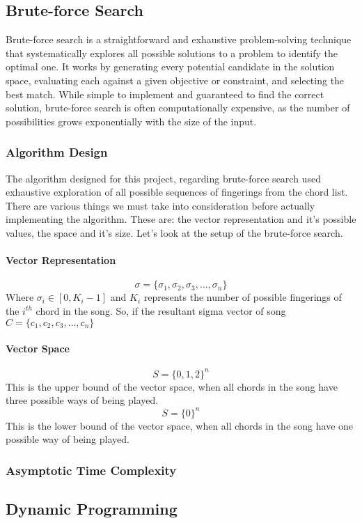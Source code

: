 \documentclass[conference]{IEEEtran}
\begin{document}
\subsection{Brute-force Search}
Brute-force search is a straightforward and exhaustive problem-solving technique that systematically explores all possible solutions to a problem to identify the optimal one. It works by generating every potential candidate in the solution space, evaluating each against a given objective or constraint, and selecting the best match. While simple to implement and guaranteed to find the correct solution, brute-force search is often computationally expensive, as the number of possibilities grows exponentially with the size of the input. 
\subsubsection{Algorithm Design}
The algorithm designed for this project, regarding brute-force search used exhaustive exploration of all possible sequences of fingerings from the chord list. There are various things we must take into consideration before actually implementing the algorithm. These are: the vector representation and it's possible values, the space and it's size. Let's look at the setup of the brute-force search.
\paragraph{Vector Representation}
\[
    \sigma = \{\sigma_1, \sigma_2, \sigma_3, \ldots, \sigma_n\}
\]
\indent Where \(\sigma_i \in [0, K_i - 1]\) and \( K_i \) represents the number of possible fingerings of the $i^{th}$ chord in the song. So, if the resultant sigma vector of song \(C=\{c_1, c_2, c_3, \dots, c_n\}\)

\paragraph{Vector Space}
\[
    S = \{0,1,2\}^{n}
\]
This is the upper bound of the vector space, when all chords in the song have three possible ways of being played. 
\[
    S = \{0\}^{n}    
\]
This is the lower bound of the vector space, when all chords in the song have one possible way of being played.

\subsubsection{Asymptotic Time Complexity}

\subsection{Dynamic Programming}
\end{document}
